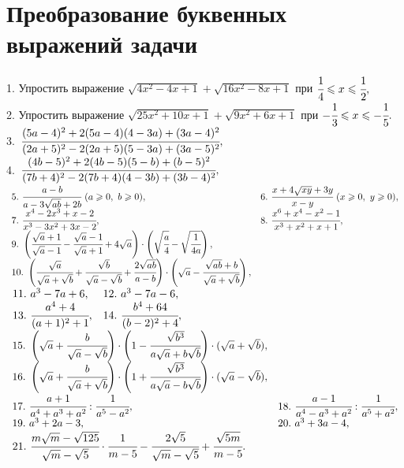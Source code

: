 \documentclass[12pt]{article}
\begin{document}
\section{Преобразование буквенных выражений задачи}
1. Упростить выражение $\sqrt{4x^2-4x+1}+\sqrt{16x^2-8x+1}$ при $\cfrac{1}{4}\leqslant x\leqslant\cfrac{1}{2},$\\
2. Упростить выражение $\sqrt{25x^2+10x+1}+\sqrt{9x^2+6x+1}$ при $-\cfrac{1}{3}\leqslant x\leqslant-\cfrac{1}{5}.$\\
3.\ $\cfrac{(5a-4)^2+2(5a-4)(4-3a)+(3a-4)^2}{(2a+5)^2-2(2a+5)(5-3a)+(3a-5)^2},$\\
4.\ $\cfrac{(4b-5)^2+2(4b-5)(5-b)+(b-5)^2}{(7b+4)^2-2(7b+4)(4-3b)+(3b-4)^2},$\\
$\begin{array}{ll}
5.\ \cfrac{a-b}{a-3\sqrt{ab}+2b}\ (a\geqslant0,\ b\geqslant0),&
6.\ \cfrac{x+4\sqrt{xy}+3y}{x-y}\ (x\geqslant0,\ y\geqslant0),\\
7.\ \cfrac{x^4-2x^3+x-2}{x^3-3x^2+3x-2},&
8.\ \cfrac{x^6+x^4-x^2-1}{x^3+x^2+x+1},\\
9.\ \left(\cfrac{\sqrt{a}+1}{\sqrt{a}-1}-\cfrac{\sqrt{a}-1}{\sqrt{a}+1}+4\sqrt{a}\right)\cdot
\left(\sqrt{\cfrac{a}{4}}-\sqrt{\cfrac{1}{4a}}\right),\\
10.\ \left(\cfrac{\sqrt{a}}{\sqrt{a}+\sqrt{b}}+\cfrac{\sqrt{b}}{\sqrt{a}-\sqrt{b}}+
\cfrac{2\sqrt{ab}}{a-b}\right)\cdot\left(\sqrt{a}-\cfrac{\sqrt{ab}+b}{\sqrt{a}+\sqrt{b}}\right),
\end{array}$\\
$\begin{array}{ll}
11.\ a^3-7a+6,&
12.\ a^3-7a-6,\\
13.\ \cfrac{a^4+4}{(a+1)^2+1},&
14.\ \cfrac{b^4+64}{(b-2)^2+4},\end{array}$\\ $\begin{array}{ll}
15.\ \left(\sqrt{a}+\cfrac{b}{\sqrt{a}-\sqrt{b}}\right)\cdot\left(1-\cfrac{\sqrt{b^3}}{a\sqrt{a}+b\sqrt{b}}\right)\cdot
(\sqrt{a}+\sqrt{b}),\\
16.\ \left(\sqrt{a}+\cfrac{b}{\sqrt{a}+\sqrt{b}}\right)\cdot\left(1+\cfrac{\sqrt{b^3}}{a\sqrt{a}-b\sqrt{b}}\right)\cdot
(\sqrt{a}-\sqrt{b}),\\
17.\ \cfrac{a+1}{a^4+a^3+a^2}: \cfrac{1}{a^5-a^2},&
18.\ \cfrac{a-1}{a^4-a^3+a^2}: \cfrac{1}{a^5+a^2},\\
19.\ a^3+2a-3,&
20.\ a^3+3a-4,
\end{array}$\\
$\begin{array}{ll}
21.\ \cfrac{m\sqrt{m}-\sqrt{125}}{\sqrt{m}-\sqrt{5}}\cdot\cfrac{1}{m-5}-\cfrac{2\sqrt{5}}{\sqrt{m}-\sqrt{5}}+\cfrac{\sqrt{5m}}{m-5}.\\
\end{array}$\\
\end{document}
